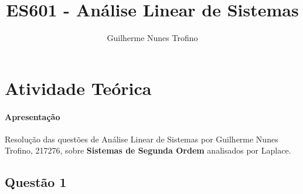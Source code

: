 \documentclass{article}
\title{ES601 - Análise Linear de Sistemas}
\author{Guilherme Nunes Trofino}
\begin{document}
    \maketitle
\newpage

    \section{Atividade Teórica}
        \paragraph{Apresentação}Resolução das questões de Análise Linear de Sistemas por Guilherme Nunes Trofino, 217276, sobre \textbf{Sistemas de Segunda Ordem} analisados por Laplace.

        \subsection{Questão 1}
\end{document}
